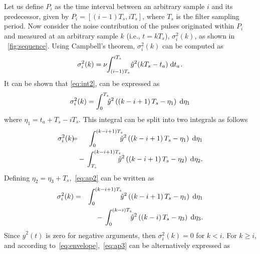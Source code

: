 Let us define $P_i$ as the time interval between an arbitrary sample $i$ and its predecessor, given by $P_i=[(i-1)T_s, iT_s]$, where $T_s$ is the filter sampling period. Now consider the noise contribution of the pulses originated within $P_i$ and measured at an arbitrary sample $k$ (i.e., $t=kT_s$), $\sigma_i^2(k)$, as shown in \figurename~\ref{fig:sequence}. Using Campbell's theorem,  $\sigma_i^2(k)$ can be computed as
\begin{equation}
\sigma_i^2(k) = \nu\hspace{-.25em} \int_{(i-1)T_s}^{iT_s} \hspace{-.15em}  \hat{y}^2(kT_s-t_a)\;\mathrm{d}t_a\hspace{0.1em}. \label{eq:int2}
\end{equation}
It can be shown that \eqref{eq:int2}, can be expressed as
\begin{equation}
		\sigma_i^2(k) = \int_{0}^{T_s} \hspace{-.45em} \hat{y}^2\left(\left(k-i+1\right)T_s-\eta_1\right)\; \mathrm{d}\eta_1 
		\label{eq:ap1}
\end{equation}
where $\eta_1 = t_a+T_s-iT_s$. This integral can be split into two integrals as follows
\begin{eqnarray}
		\sigma_i^2(k) \hspace{-0.6em} &=& \hspace{-0.6em} \int_{0}^{(k-i+1)T_s} \hspace{-.65em} \hat{y}^2\left(\left(k-i+1\right)T_s-\eta_1\right)\; \mathrm{d}\eta_1 \nonumber\\
		&&\hspace{-0.8em}{-}\: \int_{T_s}^{(k-i+1)T_s} \hspace{-.65em} \hat{y}^2\left(\left(k-i+1\right)T_s-\eta_2\right)\; \mathrm{d}\eta_2.  
		\label{eq:ap2}
\end{eqnarray}
Defining $\eta_2 = \eta_3 + T_s$,~\eqref{eq:ap2} can be written as
\begin{eqnarray}
		\sigma_i^2(k) &=& \int_{0}^{(k-i+1)T_s} \hspace{-.45em} \hat{y}^2\left(\left(k-i+1\right)T_s-\eta_1\right)\; \mathrm{d}\eta_1 \nonumber\\
		&&{-}\: \int_{0}^{(k-i)T_s} \hspace{-.45em} \hat{y}^2\left(\left(k-i\right)T_s-\eta_3\right)\; \mathrm{d}\eta_3.  
		\label{eq:ap3}
\end{eqnarray}
Since $\hat{y}^2(t)$ is zero for negative arguments, then \mbox{$\sigma_i^2(k)= 0$} for $k < i$. For $k \geq i$, and according to~\eqref{eq:envelope},~\eqref{eq:ap3} can be alternatively expressed as

